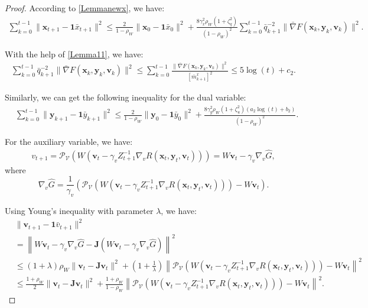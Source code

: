 \documentclass{article}
\theoremstyle{plain}
\theoremstyle{definition}
\theoremstyle{remark}
\begin{document}
\begin{proof}
According to \cref{Lemmanewx}, we have:
\begin{align}
\sum_{k=0}^{t-1} \|\mathbf{x}_{t+1} - \mathbf{1} \bar{x}_{t+1} \|^2 \leq \frac{2}{1 - \rho_W} \|\mathbf{x}_0 - \mathbf{1} \bar{x}_0\|^2 
+ \frac{8 \gamma_x^2 \rho_W (1 + \zeta_q^2)}{(1 - \rho_W)^2} \sum_{k=0}^{t-1} 
 \bar{q}_{k+1}^{-2} \|\bar{\nabla}F(\mathbf{x}_k, \mathbf{y}_k, \mathbf{v}_k)\|^2.\label{eq42}
\end{align}

With the help of \cref{Lemma11}, we have:
\begin{align}
\sum_{k=0}^{t-1}  \bar{q}_{k+1}^{-2} \|\bar{\nabla} F(\mathbf{x}_k, \mathbf{y}_k, \mathbf{v}_k)\|^2 \leq\sum_{k=0}^{t-1}\frac{\|\bar{\nabla} F(\mathbf{x}_k,\mathbf{y}_k,\mathbf{v}_k)\|^2}{[\bar{m}^x_{k+1}]^2}
 \leq  5 \log(t) + c_2.\label{eq43}
\end{align}

Similarly, we can get the following inequality for the dual variable:
\begin{align}
    &\sum_{k=0}^{t-1}\|\mathbf{y}_{k+1} - \mathbf{1} \bar{y}_{k+1} \|^2\leq  \frac{2}{1 - \rho_W} \|\mathbf{y}_0 - \mathbf{1} \bar{y}_0\|^2 
+ \frac{8 \gamma_y^2 \rho_W (1 + \zeta_u^2)(a_2 \log(t) + b_2)}{(1 - \rho_W)^2}.\label{eq44}
\end{align}

For the auxiliary variable, we have:
\begin{align}
    v_{t+1} = \mathcal{P}_{\mathcal{V}} \left( W \left( \mathbf{v}_t - \gamma_v Z_{t+1}^{-1} \nabla_v R(\mathbf{x}_t, \mathbf{y}_t, \mathbf{v}_t) \right) \right) = W \mathbf{v}_t - \gamma_v \nabla_v \hat{G},\label{eq45}
\end{align}
where
\begin{equation}
    \nabla_v \hat{G} = \frac{1}{\gamma_v} \left( \mathcal{P}_{\mathcal{V}}  \left( W \left( \mathbf{v}_t - \gamma_v Z_{t+1}^{-1} \nabla_v R(\mathbf{x}_t, \mathbf{y}_t, \mathbf{v}_t)\right) \right) - W \mathbf{v}_t\right).\label{eq46}
\end{equation}

Using Young’s inequality with parameter \(\lambda\), we have:
\begin{align}
&\|\mathbf{v}_{t+1} - \mathbf{1} \bar{v}_{t+1} \|^2\nonumber\\
&=  \left\| W \mathbf{v}_{t} - \gamma_v \nabla_v \hat{G} - \mathbf{J} \left( W\mathbf{v}_{t}- \gamma_v \nabla_v \hat{G} \right) \right\|^2 \nonumber \\
&\leq (1 + \lambda) \rho_W  \|\mathbf{v}_{t} - \mathbf{J} \mathbf{v}_{t}\|^2 
+ \left( 1 + \frac{1}{\lambda} \right)  \left\|\mathcal{P}_{\mathcal{V}}  \left( W \left( \mathbf{v}_t - \gamma_v Z_{t+1}^{-1} \nabla_v R(\mathbf{x}_t, \mathbf{y}_t, \mathbf{v}_t)\right) \right) - W \mathbf{v}_t \right\|^2 \nonumber \\
&\leq \frac{1 + \rho_W}{2}  \|\mathbf{v}_{t} - \mathbf{J} \mathbf{v}_{t}\|^2
+ \frac{1 + \rho_W}{1 - \rho_W} \left\|\mathcal{P}_{\mathcal{V}}  \left( W \left( \mathbf{v}_t - \gamma_v Z_{t+1}^{-1} \nabla_v R(\mathbf{x}_t, \mathbf{y}_t, \mathbf{v}_t)\right) \right) - W \mathbf{v}_t \right\|^2.\label{eq47}
\end{align}


\end{proof}
\end{document}
